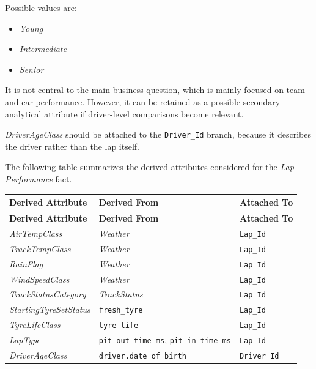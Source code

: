 \documentclass[a4paper,11pt]{article}
\begin{document}
	
	Possible values are:
	
	\begin{itemize}
		\item \textit{Young}
		\item \textit{Intermediate}
		\item \textit{Senior}
	\end{itemize}

	It is not central to the main business question, which is mainly focused on team and car
	performance. However, it can be retained as a possible secondary analytical attribute if
	driver-level comparisons become relevant.
	
	\textit{DriverAgeClass} should be attached to the \texttt{Driver\_Id} branch,
	because it describes the driver rather than the lap itself.
	
	
	The following table summarizes the derived attributes considered for the
	\textit{Lap Performance} fact.
	
	\begin{longtable}{|p{4.2cm}|p{4cm}|p{3.2cm}|}
		\hline
		\textbf{Derived Attribute} & \textbf{Derived From} & \textbf{Attached To} \\
		\hline
		\endfirsthead
		
		\hline
		\textbf{Derived Attribute} & \textbf{Derived From} & \textbf{Attached To} \\
		\hline
		\endhead
		
		\textit{AirTempClass}
		& \textit{Weather}
		& \texttt{Lap\_Id} \\
		\hline
		
		\textit{TrackTempClass}
		& \textit{Weather}
		& \texttt{Lap\_Id} \\
		\hline
		
		\textit{RainFlag}
		& \textit{Weather}
		& \texttt{Lap\_Id} \\
		\hline
		
		\textit{WindSpeedClass}
		& \textit{Weather}
		& \texttt{Lap\_Id} \\
		\hline
		
		\textit{TrackStatusCategory}
		& \textit{TrackStatus}
		& \texttt{Lap\_Id} \\
		\hline
		
		\textit{StartingTyreSetStatus}
		& \texttt{fresh\_tyre}
		& \texttt{Lap\_Id} \\
		\hline
		
		\textit{TyreLifeClass}
		& \texttt{tyre\,life}
		& \texttt{Lap\_Id} \\
		\hline
	
		\textit{LapType}
		& \texttt{pit\_out\_time\_ms}, \texttt{pit\_in\_time\_ms}
		& \texttt{Lap\_Id} \\
		\hline
		
		\textit{DriverAgeClass}
		& \texttt{driver.date\_of\_birth}
		& \texttt{Driver\_Id} \\
		\hline
	\end{longtable}
\end{document}
